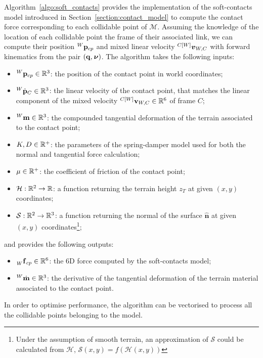 Algorithm~\ref{algo:soft_contacts} provides the implementation of the soft-contacts model introduced in Section~\ref{section:contact_model} to compute the contact force corresponding to each collidable point of $\mathcal{M}$.
Assuming the knowledge of the location of each collidable point \wrt the frame of their associated link, we can compute their position $\pos[W]_{cp}$ and mixed linear velocity $\vellin[{C[W]}]_{W,C}$ with forward kinematics from the pair $(\Qu, \Nu)$.
The algorithm takes the following inputs:
%
\begin{itemize}
    \item $\pos[W]_{cp} \in \realn^3$: the position of the contact point in world coordinates;
    \item $\posd[W]_C \in \realn^3$: the linear velocity of the contact point, that matches the linear component of the mixed velocity $\velsix[{C[W]}]_{W,C} \in \realn^6$ of frame $C$;
    \item ${}^W \mathbf{m} \in \realn^3$: the compounded tangential deformation of the terrain associated to the contact point;
    \item $K, D \in \realn^+$: the parameters of the spring-damper model used for both the normal and tangential force calculation;
    \item $\mu \in \realn^+$: the coefficient of friction of the contact point;
    \item $\mathcal{H}: \realn^2 \to \realn$: a function returning the terrain height $z_T$ at given $(x, y)$ coordinates;
    \item $\mathcal{S}: \realn^2 \to \realn^3$: a function returning the normal of the surface $\hat{\mathbf{n}}$ at given $(x, y)$ coordinates\footnote{Under the assumption of smooth terrain, an approximation of $\mathcal{S}$ could be calculated from $\mathcal{H}$, \ie $\mathcal{S}(x, y) = f\left(\mathcal{H}(x, y)\right)$};
\end{itemize}
%
and provides the following outputs:
%
\begin{itemize}
    \item $\forcesix[W]_{cp} \in \realn^6$: the 6D force computed by the soft-contacts model;
    \item ${}^W \dot{\mathbf{m}} \in \realn^3$: the derivative of the tangential deformation of the terrain material associated to the contact point.
\end{itemize}
%
In order to optimise performance, the algorithm can be vectorised to process all the collidable points belonging to the model.

